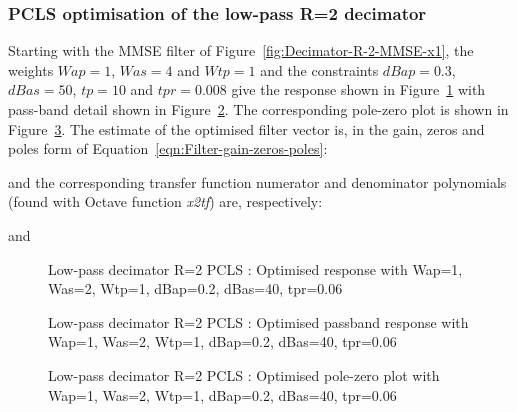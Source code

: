 \documentclass[a4paper,twoside,10pt,english]{report}
\begin{document}
\subsubsection{PCLS optimisation of the low-pass  R=2 decimator}
Starting with the MMSE filter of Figure~\ref{fig:Decimator-R-2-MMSE-x1},
the weights $Wap=1$, $Was=4$ and $Wtp=1$ and the constraints $dBap=0.3$, 
$dBas=50$, $tp=10$ and $tpr=0.008$ give the response shown in
Figure~\ref{fig:Decimator-R-2-PCLS-d1} with pass-band detail 
shown in Figure~\ref{fig:Decimator-R-2-PCLS-d1-passband}. The corresponding 
pole-zero plot is shown in Figure~\ref{fig:Decimator-R-2-PCLS-d1-pz}.
The estimate of the optimised filter vector is, in the gain, zeros and 
poles form of Equation~\ref{eqn:Filter-gain-zeros-poles}:
\begin{small}

\end{small}
and the corresponding transfer function numerator and denominator polynomials
(found with Octave function \emph{x2tf}) are, respectively:
\begin{small}

\end{small}
and
\begin{small}

\end{small}
\begin{figure}[!htbp]
\begin{center}
\scalebox{0.7}{}
\caption{Low-pass decimator R=2 PCLS : Optimised response with Wap=1, Was=2, Wtp=1, dBap=0.2, dBas=40, tpr=0.06}
\label{fig:Decimator-R-2-PCLS-d1}
\end{center}
\end{figure}
\begin{figure}[!htbp]
\begin{center}
\scalebox{0.7}{}
\caption{Low-pass decimator R=2 PCLS : Optimised passband response with Wap=1, Was=2, Wtp=1, dBap=0.2, dBas=40, tpr=0.06}
\label{fig:Decimator-R-2-PCLS-d1-passband}
\end{center}
\end{figure}
\begin{figure}[!htbp]
\begin{center}
\scalebox{0.7}{}
\caption{Low-pass decimator R=2 PCLS : Optimised pole-zero plot with Wap=1, Was=2, Wtp=1, dBap=0.2, dBas=40, tpr=0.06}
\label{fig:Decimator-R-2-PCLS-d1-pz}
\end{center}
\end{figure}
\clearpage
\end{document}
